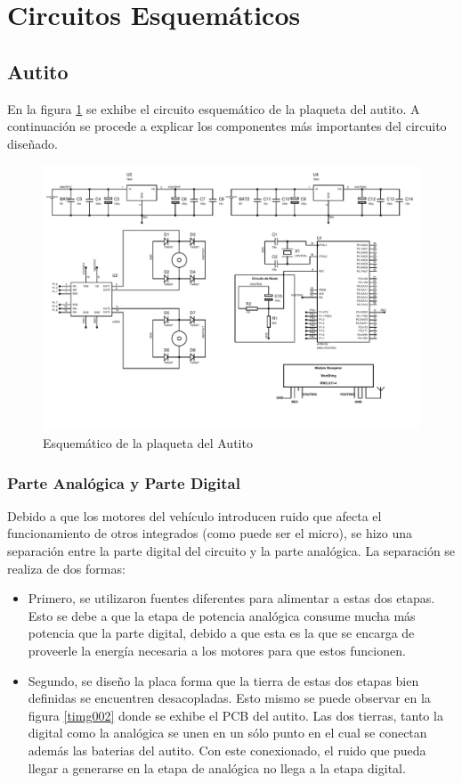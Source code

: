 \documentclass[a4paper,10pt]{article}
\begin{document}
	\section{Circuitos Esquemáticos}
		\subsection{Autito}
			En la figura \ref{timg001} se exhibe el circuito esquemático de la plaqueta del autito. A continuación se procede a explicar los componentes más 
			importantes del circuito diseñado.

			\begin{figure}[!htb]
				\centering
				\includegraphics[width=14cm]{Imagenes/EsquematicoAuto.PDF}
				\caption{Esquemático de la plaqueta del Autito} \label{timg001}
			\end{figure}

				\subsubsection{Parte Analógica y Parte Digital}
					Debido a que los motores del vehículo introducen ruido que afecta el funcionamiento de otros integrados (como puede ser el micro), se hizo una 
					separación entre la parte digital del circuito y la parte analógica. La separación se realiza de dos formas: 
			
					\begin{itemize}
						\item Primero, se utilizaron fuentes diferentes para alimentar a estas dos etapas. Esto se debe a que la etapa de potencia analógica consume
						mucha más potencia que la parte digital, debido a que esta es la que se encarga de proveerle la energía necesaria a los motores para que 
						estos funcionen.
						\item Segundo, se diseño la placa forma que la tierra de estas dos etapas bien definidas se encuentren desacopladas. Esto mismo se puede observar
						en la figura \ref{timg002} donde se exhibe el PCB del autito. Las dos tierras, tanto la digital como la analógica se unen en un sólo punto en el 
						cual se conectan además las baterias del autito. Con este conexionado, el ruido que pueda llegar a generarse en la etapa de analógica no llega a 
						la etapa digital.    
					\end{itemize}
\end{document}
